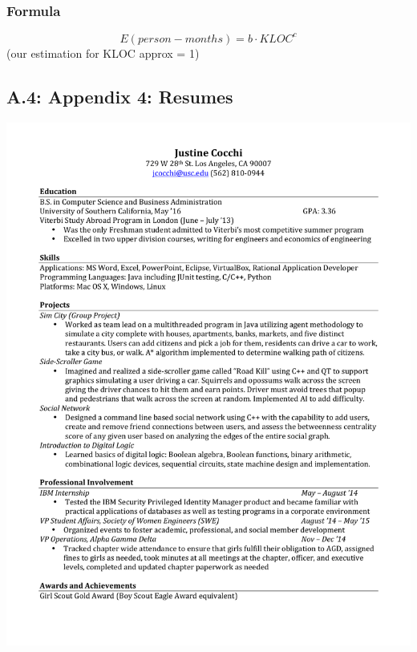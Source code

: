 \documentclass[]{article}
\begin{document}
\subsubsection{Formula}\label{formula}

\[
E(person-months) = b \cdot KLOC^c
\] (our estimation for KLOC approx = 1)

\subsection{A.4: Appendix 4: Resumes}\label{a.4-appendix-4-resumes}
\includegraphics{justine.pdf}
\pagebreak

\pagebreak
\end{document}
